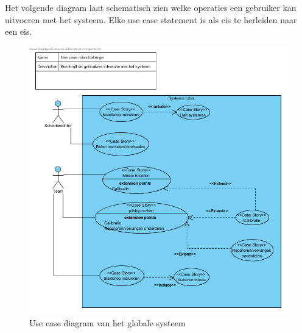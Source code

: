 \documentclass[12pt]{article} %
\begin{document}
Het volgende diagram laat schematisch zien welke operaties een gebruiker kan uitvoeren met het systeem. Elke use case statement is als eis te herleiden naar een eis.
\begin{center}
\begin{figure}
\includegraphics[scale=.9]{usecase.png}
\caption{Use case diagram van het globale systeem}
\label{fig:usecase}
\end{figure}
\end{center}
\clearpage
\end{document}
